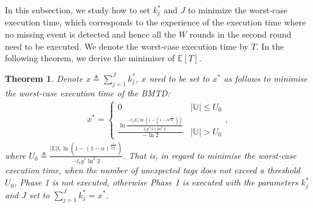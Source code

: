 \documentclass[10pt, twocolumn]{IEEEtran}
\newtheorem{theorem}{Theorem}
\begin{document}
In this subsection, we study how to set $k^*_j$ and $J$ to minimize the worst-case execution time, which corresponds to the experience of the execution time where no missing event is detected and hence all the $W$ rounds in the second round need to be executed. We denote the worst-case execution time by $T$. In the following theorem, we derive the minimiser of $\mathbb{E}[T]$.


\begin{theorem}
\label{Lem:Par_I}
Denote $x \triangleq \sum_{j=1}^{J} k^*_j$, $x$ need to be set to $x^*$ as follows to minimise the worst-case execution time of the BMTD:
\begin{align}
x^* =
\begin{cases}
0 & |\mathbb{U}| \le U_0  \\
\frac{\ln \frac{-t_r |\mathbb{E}| \ln(1-(1-\alpha^{\frac{1}{My^*}}))}{t_t y^* |\mathbb{U}| \ln^2 2}}{-\ln 2} & |\mathbb{U}| > U_0
\end{cases},
\label{Eq:x*}
\end{align}
where $U_0\triangleq \frac{|\mathbb{E}| t_r \ln(1-(1-\alpha)^{\frac{1}{M y^*}})}{-t_t y^* \ln^2 2}$. That is, in regard to minimise the worst-case execution time, when the number of unexpected tags does not exceed a threshold $U_0$, Phase 1 is not executed, otherwise Phase 1 is executed with the parameters $k^*_j$ and $J$ set to $\sum_{j=1}^{J} k^*_j=x^*$.
\end{theorem}
\end{document}
